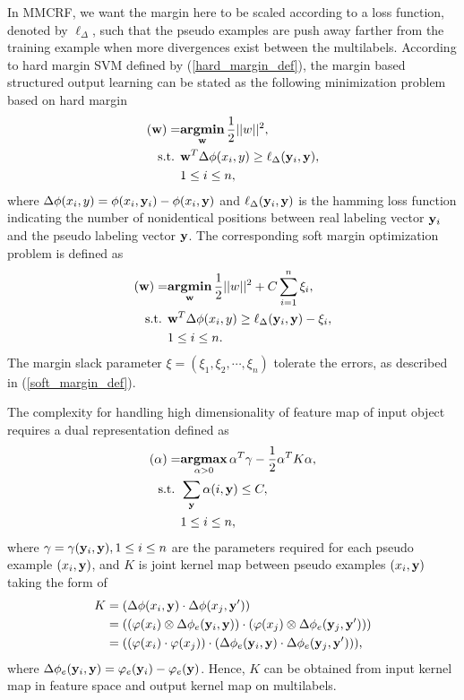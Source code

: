 \documentclass[english]{tktltiki}
\newcommand{\argmax}{\textbf{argmax}}
\newcommand{\argmin}{\textbf{argmin}}
\newcommand{\yb}{{\bf y}}
\newcommand{\wb}{{\bf w}}
\newcommand{\lsym}{\ell_\Delta}
\begin{document}
In MMCRF, we want the margin here to be scaled according to a loss function, denoted by $\lsym$, such that the pseudo examples are push away farther from the training example when more divergences exist between the multilabels. According to hard margin SVM defined by (\ref{hard_margin_def}), the margin based structured output learning can be stated as the following minimization problem based on hard margin
\begin{align*}
(\wb) =& \underset{\wb}{\operatorname{\argmin}} \, \frac{1}{2}||w||^2, \\
 \text{s.t. } & \wb^T\Delta\phi(x_i,y) \ge \lsym(\yb_i,\yb), \\
 &  1 \le i \le n,
\end{align*}
where $\Delta\phi(x_i,y) = \phi(x_i,\yb_i) - \phi(x_i, \yb)$ and $\lsym(\yb_i,\yb)$ is the hamming loss function indicating the number of nonidentical positions between real labeling vector $\yb_i$ and the pseudo labeling vector $\yb$. The corresponding soft margin optimization problem is defined as
\begin{align*}
(\wb) =& \underset{\wb}{\operatorname{\argmin}} \, \frac{1}{2}||w||^2 + C\sum_{i=1}^{n}{\xi_i}, \\
 \text{s.t. } & \wb^T\Delta\phi(x_i,y) \ge \lsym(\yb_i,\yb) - \xi_i,\\
 &  1 \le i \le n.
\end{align*}
The margin slack parameter $\xi = (\xi_1,\xi_2,\cdots,\xi_n)$ tolerate the errors, as described in (\ref{soft_margin_def}).

The complexity for handling high dimensionality of feature map of input object requires a dual representation defined as
\begin{align}
(\alpha) =& \underset{\alpha > 0}{\operatorname{\argmax}} \, \alpha^T\gamma - \frac{1}{2}\alpha^TK\alpha, \label{MMCRF_dual}\\
 \text{s.t. } & \sum_{\yb}\alpha(i,\yb) \le C, \nonumber \\
 & 1 \le i \le n, \nonumber
\end{align}
where $\gamma = \gamma(\yb_i,\yb), 1 \le i \le n$ are the parameters required for each pseudo example $(x_i,\yb)$, and $K$ is joint kernel map between pseudo examples $(x_i, \yb)$ taking the form of 
\begin{align*}
K &= (\Delta\phi(x_i,\yb) \cdot \Delta\phi(x_j,\yb')) \\
 & = ((\varphi(x_i) \otimes \Delta\phi_e(\yb_i, \yb)) \cdot (\varphi(x_j) \otimes \Delta\phi_e(\yb_j, \yb'))) \\
 & = ((\varphi(x_i) \cdot \varphi(x_j)) \cdot (\Delta\phi_e(\yb_i,\yb) \cdot \Delta\phi_e(\yb_j,\yb'))),
\end{align*}
where $\Delta\phi_e(\yb_i,\yb) = \varphi_e(\yb_i) - \varphi_e(\yb)$. Hence, $K$ can be obtained from input kernel map in feature space and output kernel map on multilabels. 
\end{document}
